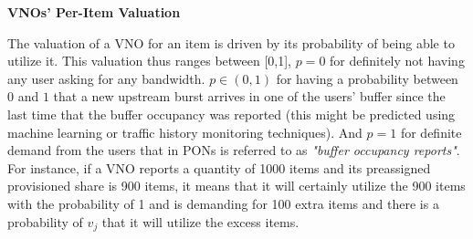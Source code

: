 \begin{Definition}
\textbf{\acp{VNO}' Per-Item Valuation}

The valuation of a \ac{VNO} for an item is driven by its probability of being able to utilize it. This valuation thus ranges between [0,1], $p=0$ for definitely not having any user asking for any bandwidth. $p \in (0,1)$ for having a probability between $0$ and $1$ that a new upstream burst arrives in one of the users' buffer since the last time that the buffer occupancy was reported (this might be predicted using machine learning or traffic history monitoring techniques). And $p=1$ for definite demand from the users that in \acp{PON} is referred to as \textit{"buffer occupancy reports"}. For instance, if a \ac{VNO} reports a quantity of 1000 items and its preassigned provisioned share is 900 items, it means that it will certainly utilize the 900 items with the probability of 1 and is demanding for 100 extra items and there is a probability of $v_j$ that it will utilize the excess items.
\end{Definition}
